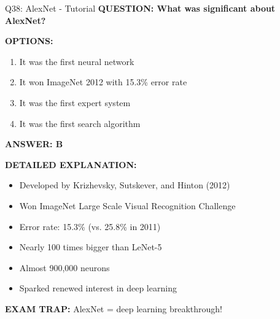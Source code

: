 \documentclass[8pt]{beamer}
\begin{document}
	\begin{frame}{Q38: AlexNet - Tutorial}
		\fontsize{6.5}{7.5}\selectfont
		\textbf{QUESTION: What was significant about AlexNet?}
		
		\vspace{0.1cm}
		\textbf{OPTIONS:}
		\begin{enumerate}
			\item It was the first neural network
			\item It won ImageNet 2012 with 15.3\% error rate
			\item It was the first expert system
			\item It was the first search algorithm
		\end{enumerate}
		
		\vspace{0.1cm}
		\textcolor{myblue}{\textbf{ANSWER: B}}
		
		\vspace{0.1cm}
		\textbf{DETAILED EXPLANATION:}
		\begin{itemize}
			\item Developed by Krizhevsky, Sutskever, and Hinton (2012)
			\item Won ImageNet Large Scale Visual Recognition Challenge
			\item Error rate: 15.3\% (vs. 25.8\% in 2011)
			\item Nearly 100 times bigger than LeNet-5
			\item Almost 900,000 neurons
			\item Sparked renewed interest in deep learning
		\end{itemize}
		
		\vspace{0.1cm}
		\textcolor{myred}{\textbf{EXAM TRAP:}} AlexNet = \textcolor{myblue}{deep learning breakthrough}!
	\end{frame}
	
\end{document}

